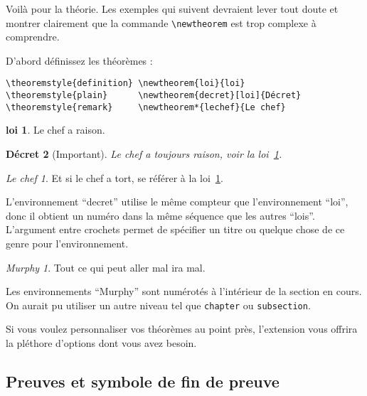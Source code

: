 Voilà pour la théorie. Les exemples qui suivent devraient lever tout
doute et montrer clairement que la commande \verb|\newtheorem| est
trop complexe à comprendre.

\theoremstyle{definition} \newtheorem{loi}{loi}
\theoremstyle{plain}      \newtheorem{decret}[loi]{Décret}
\theoremstyle{remark}     \newtheorem*{lechef}{Le chef}

D'abord définissez les théorèmes :

\begin{verbatim}
\theoremstyle{definition} \newtheorem{loi}{loi}
\theoremstyle{plain}      \newtheorem{decret}[loi]{Décret}
\theoremstyle{remark}     \newtheorem*{lechef}{Le chef}
\end{verbatim}

\begin{example}
\begin{loi} \label{chef}
Le chef a raison.
\end{loi}
\begin{decret}[Important]
Le chef a toujours raison,
voir la loi~\ref{chef}.
\end{decret}
\begin{lechef}
Et si le chef a tort, se référer
à la loi~\ref{chef}.
\end{lechef}
\end{example}


L'environnement \enquote{decret} utilise le même compteur que l'environnement
\enquote{loi}, donc il obtient un numéro dans la même
séquence que les autres \enquote{lois}. L'argument entre crochets permet
de spécifier un titre ou quelque chose de ce genre pour l'environnement.
\begin{example}
\newtheorem{mur}{Murphy}[section]
\begin{mur} Tout ce qui peut 
aller mal ira mal.\end{mur}
\end{example}

Les environnements \enquote{Murphy} sont numérotés à l'intérieur de la section
en cours. On aurait pu utiliser un autre niveau tel que \texttt{chapter}
ou \texttt{subsection}. 

Si vous voulez personnaliser vos théorèmes au point près, l'extension
 vous offrira la pléthore d'options dont vous avez
besoin.

\subsection{Preuves et symbole de fin de preuve}
\label{sec:putting-qed-right}

